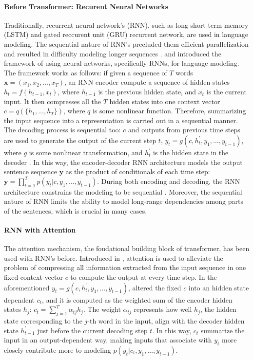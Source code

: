 \paragraph{Before Transformer: Recurent Neural Networks}
Traditionally, recurrent neural network's (RNN), such as long short-term memory (LSTM) and gated reccurent unit (GRU) recurrent network, are used in language modeling.
The sequential nature of RNN's precluded them efficient parallelization and resulted in difficulty modeling longer sequences \citep{attentionAllYouNeed}. 
\citet{encoderDecoderRNN} and \citet{encoderDecoderRNN2} introduced the framework of using neural networks, specifically 
RNNs, for language modeling. The framework works as follows:  
if given a sequence of $T$ words $\mathbf{x} =  (x_1,x_2,\dots, x_{T})$, an RNN encoder compute a sequence of hidden states $h_t = f(h_{t-1}, x_t)$, where $h_{t-1}$ is the previous hidden state, and $x_t$ is the current input. It then compresses all the $T$ hidden states into one context vector $c = q(\{h_1,\dots,h_T\})$, where $q$ is some nonlinear function. Therefore, summarizing the input sequence into a representation is carried out in a sequential manner.  
The decoding process is sequential too: $c$ and outputs from previous time steps are used to generate the output of the current step $t$, $y_t = g(c, h_t^{'}, y_1,\dots,y_{t-1})$, where $g$ is some nonlinear transformation, and $h_t^{'}$ is the hidden state in the decoder \citep{encoderDecoderRNN,encoderDecoderRNN2}.
In this way, the encoder-decoder RNN architecture models the output sentence sequence $\mathbf{y}$ as the product of conditionals of each time step: $\mathbf{y} = \prod_{t=1}^T p(y_t | c,y_1,\dots,y_{t-1})$.  
During both encoding and decoding, the RNN architecture constrains the modeling to be sequential \citep{attentionRNN}. Moreover, the sequential nature of RNN limits the ability to model long-range dependencies among parts of the sentences, which is crucial in many cases. 

\paragraph{RNN with Attention}
The attention mechanism, the foudational building block of transformer, has been used with RNN's before. 
Introduced in \citet{attentionRNN}, attention is used to alleviate the problem of compressing all information extracted from the input sequence in one fixed context vector $c$ to compute the output at every time step. In the aforementioned 
$y_t = g(c, h_t^{'}, y_1,\dots,y_{t-1})$, \citet{attentionRNN} altered the fixed $c$ into an hidden state dependent $c_t$, and it is computed as the weighted sum of the encoder hidden states $h_j$: $c_t = \sum_{j=1}^{T} \alpha_{tj} h_j$. The weight $\alpha_{tj}$ represents how well $h_j$, the hidden state corresponding to the $j$-th word in the input, align with the decoder hidden state $h_{t-1}^{'}$ just before the current decoding step $t$. In this way, $c_t$ summarize the input in an output-dependent way, making inputs that associate with $y_t$ more closely contribute more to modeling $ p(y_t | c_t,y_1,\dots,y_{t-1})$.   

